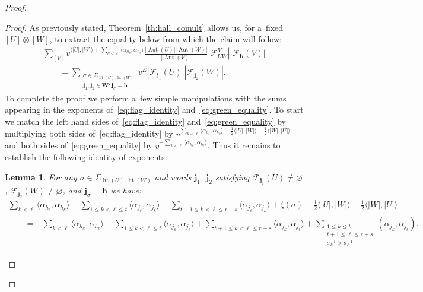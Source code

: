 \documentclass[11pt]{article}
\numberwithin{equation}{section}
\newtheorem{Lemma}[Theorem]{Lemma}
\begin{document}
\begin{proof}
\begin{proof}
As previously stated, Theorem~\ref{th:hall_comult} allows us, for a~f\/ixed $[U]\otimes[W]$, to extract the equality below
from which the claim will follow:
\begin{gather}
\sum\limits_{[V]}v^{\langle|U|,|W|\rangle+\sum\limits_{k<\ell}\langle\alpha_{h_k},\alpha_{h_\ell}\rangle}
\frac{|\operatorname{Aut}(U)||\operatorname{Aut}(W)|}{|\operatorname{Aut}(V)|}|\mathcal{F}^V_{UW}||\mathcal{F}_\mathbf{h}(V)|
\nonumber
\\
\qquad
=\sum\limits_{\substack{\sigma\in\Sigma_{\operatorname{ht}(U),\operatorname{ht}(W)}\\
\mathbf{j}_1,\mathbf{j}_2\in\mathbf{W}: \mathbf{j}_\sigma=\mathbf{h}}}
v^E|\mathcal{F}_{\mathbf{j}_1}(U)||\mathcal{F}_{\mathbf{j}_2}(W)|.
\label{eq:green_equality}
\end{gather}
To complete the proof we perform a~few simple manipulations with the sums appearing in the exponents
of~\eqref{eq:flag_identity} and~\eqref{eq:green_equality}.
To start we match the left hand sides of~\eqref{eq:flag_identity} and~\eqref{eq:green_equality} by multiplying both
sides of~\eqref{eq:flag_identity} by $v^{\sum\limits_{k<\ell}\langle
\alpha_{h_\ell},\alpha_{h_k}\rangle-\frac{1}{2}\langle |U|,|W|\rangle-\frac{1}{2}\langle |W|,|U|\rangle}$ and both sides
of~\eqref{eq:green_equality} by $v^{-\sum\limits_{k<\ell}\langle \alpha_{h_k},\alpha_{h_\ell}\rangle}$.
Thus it remains to establish the following identity of exponents.
\begin{Lemma}
\label{lem:exp_equality}
For any $\sigma\in\Sigma_{\operatorname{ht}(U),\operatorname{ht}(W)}$ and words $\mathbf{j}_1$, $\mathbf{j}_2$ satisfying
$\mathcal{F}_{\mathbf{j}_1}(U)\ne\varnothing$, $\mathcal{F}_{\mathbf{j}_2}(W)\ne\varnothing$, and
$\mathbf{j}_\sigma=\mathbf{h}$ we have:
\begin{gather}
\nonumber
\sum\limits_{k<\ell}\langle \alpha_{h_\ell},\alpha_{h_k}\rangle
-\!\sum\limits_{1\le k<\ell\le t}\!\!\langle\alpha_{j_\ell},\alpha_{j_k}\rangle
-\!\sum\limits_{t+1\le k<\ell\le r+s}\!\!\langle\alpha_{j_\ell},\alpha_{j_k}\rangle
+\zeta(\sigma)-\frac{1}{2}\langle |U|,|W|\rangle-\frac{1}{2}\langle|W|,|U|\rangle
\nonumber
\\
\qquad
=-\sum\limits_{k<\ell}\langle \alpha_{h_k},\alpha_{h_\ell}\rangle+\sum\limits_{1\le k<\ell\le t}\!\!\langle\alpha_{j_k},\alpha_{j_\ell}\rangle
+\sum\limits_{t+1\le k<\ell\le r+s}\!\!\!\!\langle\alpha_{j_k},\alpha_{j_\ell}\rangle
+\!\!\!\sum\limits_{\substack{1\le k\le t\\t+1\le\ell\le r+s\\ \sigma_k^{-1}>\sigma_\ell^{-1}}}\!\!\!\!(\alpha_{j_k},\alpha_{j_\ell}). %
\label{eq:exp_equality}
\end{gather}
\end{Lemma}


\end{proof}
\end{proof}
\end{document}

